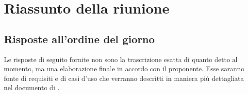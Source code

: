 %


\section{Riassunto della riunione} %
\label{sec:riassunto_della_riunione}

\subsection{Risposte all'ordine del giorno}
Le risposte di seguito fornite non sono la trascrizione esatta di quanto detto al momento, ma una elaborazione finale in accordo con il proponente. \newline
Esse saranno fonte di requisiti e di casi d'uso che verranno descritti in maniera più dettagliata nel documento di \docNameVersionAdR.

